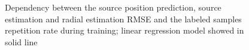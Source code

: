 \documentclass[applsci,article,submit,moreauthors,pdftex]{Definitions/mdpi}
\begin{document}
\begin{figure}[h!]
	\centering
	\caption{Dependency between the source position prediction, source \doa{} estimation  and radial estimation RMSE and the labeled samples repetition rate during \grnn{} training; linear regression model showed in solid line}
	\label{fig:rmsekrep}
\end{figure}
\end{document}

